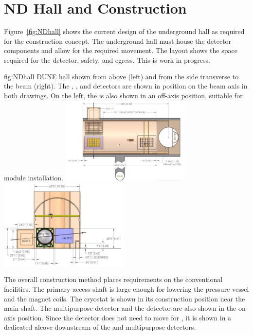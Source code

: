 \section{ND Hall and Construction}
\label{sec:exsum-nd-hall}
%

Figure~\ref{fig:NDhall} shows the current design of the underground hall as required for the   construction concept. The underground hall must house the detector components and allow for the required movement. The layout shows the space required for the detector, safety, and egress.  This is work in progress. 

\begin{dunefigure}{fig:NDhall}
{DUNE   hall shown from above (left) and from the side transverse to the beam (right). The , , and  detectors are shown in position on the beam axis in both drawings.  On the left, the  is also shown in an off-axis position, suitable for module installation. }
\includegraphics[width=0.49\textwidth]{graphics/NDhall1.jpg}
\includegraphics[width=0.49\textwidth]{graphics/NDhall2.jpg}
\end{dunefigure}

The overall construction method places requirements on the conventional facilities. 
The primary access shaft is large enough for lowering the pressure vessel and the magnet coils. The  cryostat is shown in its construction position near the main shaft. The multipurpose detector and the  detector are also shown in the on-axis position. Since the  detector does not need to move for , it is shown in a dedicated alcove downstream of the  and multipurpose detectors.

